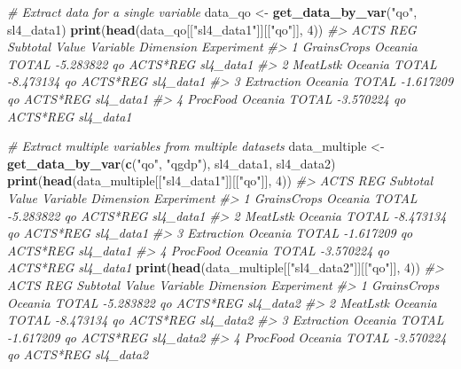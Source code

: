 \documentclass[
]{article}
\newenvironment{Shaded}{\begin{snugshade}}{\end{snugshade}}
\newcommand{\CommentTok}[1]{\textcolor[rgb]{0.56,0.35,0.01}{\textit{#1}}}
\newcommand{\DecValTok}[1]{\textcolor[rgb]{0.00,0.00,0.81}{#1}}
\newcommand{\FunctionTok}[1]{\textcolor[rgb]{0.13,0.29,0.53}{\textbf{#1}}}
\newcommand{\NormalTok}[1]{#1}
\newcommand{\OtherTok}[1]{\textcolor[rgb]{0.56,0.35,0.01}{#1}}
\newcommand{\StringTok}[1]{\textcolor[rgb]{0.31,0.60,0.02}{#1}}
\begin{document}
\begin{Shaded}
\begin{Highlighting}[]
\CommentTok{\# Extract data for a single variable}
\NormalTok{data\_qo }\OtherTok{\textless{}{-}} \FunctionTok{get\_data\_by\_var}\NormalTok{(}\StringTok{"qo"}\NormalTok{, sl4\_data1)}
\FunctionTok{print}\NormalTok{(}\FunctionTok{head}\NormalTok{(data\_qo[[}\StringTok{"sl4\_data1"}\NormalTok{]][[}\StringTok{"qo"}\NormalTok{]], }\DecValTok{4}\NormalTok{))}
\CommentTok{\#\textgreater{}          ACTS     REG Subtotal     Value Variable Dimension Experiment}
\CommentTok{\#\textgreater{} 1 GrainsCrops Oceania    TOTAL {-}5.283822       qo  ACTS*REG  sl4\_data1}
\CommentTok{\#\textgreater{} 2    MeatLstk Oceania    TOTAL {-}8.473134       qo  ACTS*REG  sl4\_data1}
\CommentTok{\#\textgreater{} 3  Extraction Oceania    TOTAL {-}1.617209       qo  ACTS*REG  sl4\_data1}
\CommentTok{\#\textgreater{} 4    ProcFood Oceania    TOTAL {-}3.570224       qo  ACTS*REG  sl4\_data1}

\CommentTok{\# Extract multiple variables from multiple datasets}
\NormalTok{data\_multiple }\OtherTok{\textless{}{-}} \FunctionTok{get\_data\_by\_var}\NormalTok{(}\FunctionTok{c}\NormalTok{(}\StringTok{"qo"}\NormalTok{, }\StringTok{"qgdp"}\NormalTok{), sl4\_data1, sl4\_data2)}
\FunctionTok{print}\NormalTok{(}\FunctionTok{head}\NormalTok{(data\_multiple[[}\StringTok{"sl4\_data1"}\NormalTok{]][[}\StringTok{"qo"}\NormalTok{]], }\DecValTok{4}\NormalTok{))}
\CommentTok{\#\textgreater{}          ACTS     REG Subtotal     Value Variable Dimension Experiment}
\CommentTok{\#\textgreater{} 1 GrainsCrops Oceania    TOTAL {-}5.283822       qo  ACTS*REG  sl4\_data1}
\CommentTok{\#\textgreater{} 2    MeatLstk Oceania    TOTAL {-}8.473134       qo  ACTS*REG  sl4\_data1}
\CommentTok{\#\textgreater{} 3  Extraction Oceania    TOTAL {-}1.617209       qo  ACTS*REG  sl4\_data1}
\CommentTok{\#\textgreater{} 4    ProcFood Oceania    TOTAL {-}3.570224       qo  ACTS*REG  sl4\_data1}
\FunctionTok{print}\NormalTok{(}\FunctionTok{head}\NormalTok{(data\_multiple[[}\StringTok{"sl4\_data2"}\NormalTok{]][[}\StringTok{"qo"}\NormalTok{]], }\DecValTok{4}\NormalTok{))}
\CommentTok{\#\textgreater{}          ACTS     REG Subtotal     Value Variable Dimension Experiment}
\CommentTok{\#\textgreater{} 1 GrainsCrops Oceania    TOTAL {-}5.283822       qo  ACTS*REG  sl4\_data2}
\CommentTok{\#\textgreater{} 2    MeatLstk Oceania    TOTAL {-}8.473134       qo  ACTS*REG  sl4\_data2}
\CommentTok{\#\textgreater{} 3  Extraction Oceania    TOTAL {-}1.617209       qo  ACTS*REG  sl4\_data2}
\CommentTok{\#\textgreater{} 4    ProcFood Oceania    TOTAL {-}3.570224       qo  ACTS*REG  sl4\_data2}


\end{Highlighting}
\end{Shaded}
\end{document}
